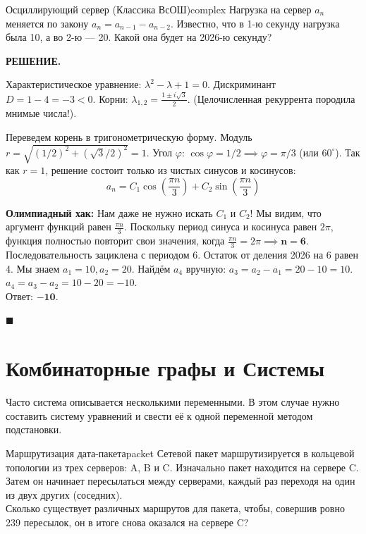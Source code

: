 \documentclass[12pt,a4paper]{article}
\newenvironment{solution}{
    \begin{tcolorbox}[
        enhanced, breakable, blanker,
        borderline west={2.5pt}{0pt}{solgray},
        left=12pt, top=5pt, bottom=5pt,
        before skip=10pt, after skip=15pt
    ]
    \textbf{\textsf{РЕШЕНИЕ.}}\;
}{
    \hfill $\blacksquare$
    \end{tcolorbox}
}
\begin{document}
\begin{problem}{Осциллирующий сервер (Классика ВсОШ)}{complex}
Нагрузка на сервер $a_n$ меняется по закону $a_n = a_{n-1} - a_{n-2}$. Известно, что в 1-ю секунду нагрузка была 10, а во 2-ю — 20. Какой она будет на 2026-ю секунду?
\end{problem}
\begin{solution}
Характеристическое уравнение: $\lambda^2 - \lambda + 1 = 0$. 
Дискриминант $D = 1 - 4 = -3 < 0$. Корни: $\lambda_{1,2} = \frac{1 \pm i\sqrt{3}}{2}$. (Целочисленная рекуррента породила мнимые числа!).

Переведем корень в тригонометрическую форму. Модуль $r = \sqrt{(1/2)^2 + (\sqrt{3}/2)^2} = 1$. Угол $\varphi$: $\cos \varphi = 1/2 \implies \varphi = \pi/3$ (или $60^\circ$).
Так как $r=1$, решение состоит только из чистых синусов и косинусов:
\[ a_n = C_1 \cos\left(\frac{\pi n}{3}\right) + C_2 \sin\left(\frac{\pi n}{3}\right) \]

\textbf{Олимпиадный хак:} Нам даже не нужно искать $C_1$ и $C_2$! Мы видим, что аргумент функций равен $\frac{\pi n}{3}$. Поскольку период синуса и косинуса равен $2\pi$, функция полностью повторит свои значения, когда $\frac{\pi n}{3} = 2\pi \implies \mathbf{n = 6}$.
Последовательность зациклена с периодом 6. 
Остаток от деления 2026 на 6 равен 4. Мы знаем $a_1=10, a_2=20$. Найдём $a_4$ вручную:
$a_3 = a_2 - a_1 = 20 - 10 = 10$. \\
$a_4 = a_3 - a_2 = 10 - 20 = -10$. \\
Ответ: $\mathbf{-10}$.
\end{solution}

\newpage
\section{Комбинаторные графы и Системы}

Часто система описывается несколькими переменными. В этом случае нужно составить систему уравнений и свести её к одной переменной методом подстановки.

\begin{problem}{Маршрутизация дата-пакета}{packet}
Сетевой пакет маршрутизируется в кольцевой топологии из трех серверов: A, B и C. Изначально пакет находится на сервере C. Затем он начинает пересылаться между серверами, каждый раз переходя на один из двух других (соседних). \\
Сколько существует различных маршрутов для пакета, чтобы, совершив ровно 239 пересылок, он в итоге снова оказался на сервере C?
\end{problem}
\end{document}
